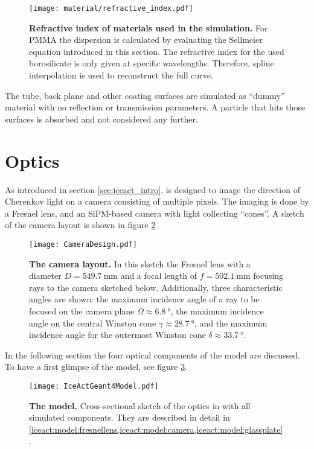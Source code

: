 \begin{figure}[H]
	\centering
	\texttt{[image: material/refractive\_index.pdf]}
	\caption[Refractive index of used materials]{\textbf{Refractive index of materials used in the simulation.} For PMMA the dispersion is calculated by evaluating the Sellmeier equation introduced in this section. The refractive index for the used borosilicate is only given at specific wavelengths. \cite{iceact:borosilicate:datasheet} Therefore, spline interpolation is used to reconstruct the full curve.}
	\label{iceact:model:material:refractive_index}	
\end{figure}

The tube, back plane and other coating surfaces are simulated as \enquote{dummy} material with no reflection or transmission parameters. A particle that hits those surfaces is absorbed and not considered any further.

\section{Optics}

As introduced in section \ref{sec:iceact_intro}, \iceact is designed to image the direction of Cherenkov light on a camera consisting of multiple pixels. The imaging is done by a Fresnel lens, and an SiPM-based camera with light collecting \enquote{cones}. A sketch of the camera layout is shown in figure \ref{iceact:camera:layout}
\begin{figure}[H]
	\centering
	\texttt{[image: CameraDesign.pdf]}
	\caption[\iceact camera layout]{\textbf{The \iceact camera layout.} \cite{iceact:camera} In this sketch the Fresnel lens with a diameter $D=\SI{549.7}{\milli\meter}$ and a focal length of $f=\SI{502.1}{\milli\meter}$ focusing rays to the camera sketched below. Additionally, three characteristic angles are shown: the maximum incidence angle of a ray to be focused on the camera plane $\Omega\approx\SI{6.8}{\degree}$, the maximum incidence angle on the central Winston cone $\gamma\approx\SI{28.7}{\degree}$, and the maximum incidence angle for the outermost Winston cone $\delta\approx\SI{33.7}{\degree}$.}
	\label{iceact:camera:layout}	
\end{figure}

In the following section the four optical components of the \iceact \geant model are discussed. To have a first glimpse of the model, see figure \ref{iceact:model:cut}.
\begin{figure}[H]
	\centering
	\texttt{[image: IceActGeant4Model.pdf]}
	\caption[\iceact \geant model]{\textbf{The \iceact \geant model.} Cross-sectional sketch of the \iceact optics in \geant with all simulated components. They are described in detail in \cref{iceact:model:fresnellens,iceact:model:camera,iceact:model:glassplate}.}
	\label{iceact:model:cut}	
\end{figure}

